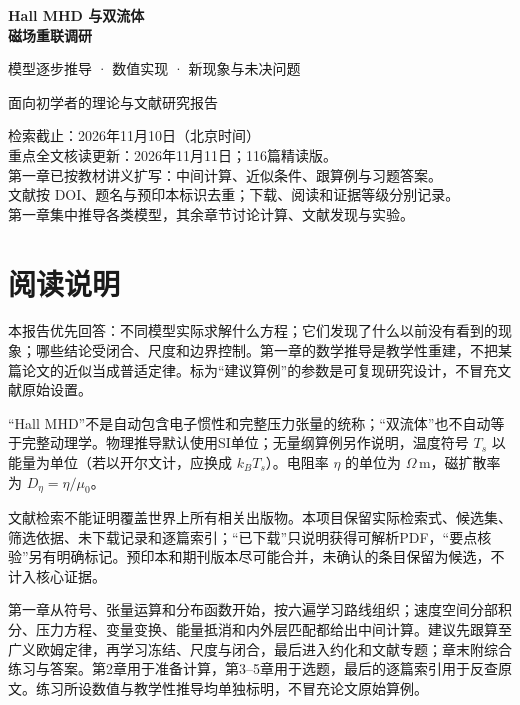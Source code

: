 \documentclass[UTF8,a4paper,11pt,openany,fontset=fandol]{ctexbook}
\begin{document}
\frontmatter
\begin{titlepage}
\vspace*{20mm}
{\sffamily\Huge\bfseries\color{ink}Hall MHD 与双流体\\[8pt]磁场重联调研\par}
\vspace{12mm}
{\sffamily\Large 模型逐步推导 · 数值实现 · 新现象与未决问题\par}
\vspace{14mm}
{\large 面向初学者的理论与文献研究报告\par}
\vfill
检索截止：2026年11月10日（北京时间）\\[5pt]
重点全文核读更新：2026年11月11日；116篇精读版。\\[5pt]
第一章已按教材讲义扩写：中间计算、近似条件、跟算例与习题答案。\\[5pt]
文献按 DOI、题名与预印本标识去重；下载、阅读和证据等级分别记录。\\[5pt]
第一章集中推导各类模型，其余章节讨论计算、文献发现与实验。\\[8pt]

\end{titlepage}
\chapter*{阅读说明}
本报告优先回答：不同模型实际求解什么方程；它们发现了什么以前没有看到的现象；哪些结论受闭合、尺度和边界控制。第一章的数学推导是教学性重建，不把某篇论文的近似当成普适定律。标为“建议算例”的参数是可复现研究设计，不冒充文献原始设置。

“Hall MHD”不是自动包含电子惯性和完整压力张量的统称；“双流体”也不自动等于完整动理学。物理推导默认使用SI单位；无量纲算例另作说明，温度符号 $T_s$ 以能量为单位（若以开尔文计，应换成 $k_BT_s$）。电阻率 $\eta$ 的单位为 $\Omega\,\mathrm m$，磁扩散率为 $D_\eta=\eta/\mu_0$。

文献检索不能证明覆盖世界上所有相关出版物。本项目保留实际检索式、候选集、筛选依据、未下载记录和逐篇索引；“已下载”只说明获得可解析PDF，“要点核验”另有明确标记。预印本和期刊版本尽可能合并，未确认的条目保留为候选，不计入核心证据。

第一章从符号、张量运算和分布函数开始，按六遍学习路线组织；速度空间分部积分、压力方程、变量变换、能量抵消和内外层匹配都给出中间计算。建议先跟算至广义欧姆定律，再学习冻结、尺度与闭合，最后进入约化和文献专题；章末附综合练习与答案。第2章用于准备计算，第3--5章用于选题，最后的逐篇索引用于反查原文。练习所设数值与教学性推导均单独标明，不冒充论文原始算例。
\tableofcontents
\mainmatter











\backmatter


\end{document}

